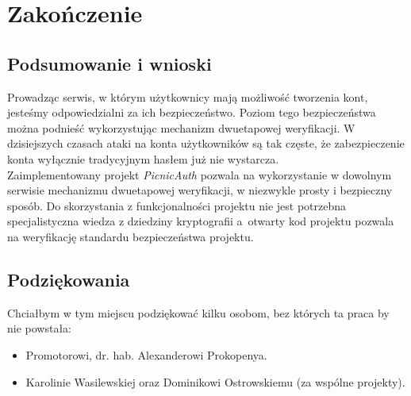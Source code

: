 \chapter{Zakończenie}

\section{Podsumowanie i wnioski}
Prowadząc serwis, w którym użytkownicy mają możliwość tworzenia kont, jesteśmy odpowiedzialni za ich bezpieczeństwo. 
Poziom tego bezpieczeństwa można podnieść wykorzystując mechanizm dwuetapowej weryfikacji. 
W dzisiejszych czasach ataki na konta użytkowników są tak częste, że zabezpieczenie konta wyłącznie tradycyjnym hasłem już nie wystarcza. \\
Zaimplementowany projekt \textit{PicnicAuth} pozwala na wykorzystanie w dowolnym serwisie mechanizmu dwuetapowej weryfikacji, 
w niezwykle prosty i bezpieczny sposób. 
Do skorzystania z funkcjonalności projektu nie jest potrzebna specjalistyczna wiedza z dziedziny kryptografii 
a~otwarty kod projektu pozwala na weryfikację standardu bezpieczeństwa projektu.

\section{Podziękowania}
Chciałbym w tym miejscu podziękować kilku osobom, bez których ta praca by nie powstała:
\begin{itemize}
	\item Promotorowi, dr. hab. Alexanderowi Prokopenya.
	\item Karolinie Wasilewskiej oraz Dominikowi Ostrowskiemu (za wspólne projekty).
\end{itemize} 